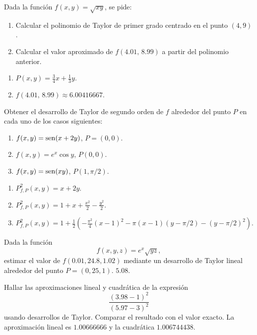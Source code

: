 
{Dada la función $f(x,y)=\sqrt{xy}$, se pide:
\begin{enumerate}
\item Calcular el polinomio de Taylor de primer grado centrado en el punto $(4,9)$.
\item Calcular el valor aproximado de $f(4.01,\,8.99)$ a partir del polinomio anterior. 
\end{enumerate}
}
{\begin{enumerate}
\item $P(x,y)= \frac{3}{4}x+\frac{1}{3}y$.
\item $f(4.01,\,8.99)\approx 6.00416667$.
\end{enumerate}
}
{
}


{Obtener el desarrollo de Taylor de segundo orden de $f$ alrededor del punto $P$ en cada uno de los casos siguientes:
\begin{enumerate}
\item $f(x,y)=\operatorname{sen}(x+2y)$, $P=(0,0)$.
\item $f(x,y)=e^x\cos y$, $P(0,0)$.
\item $f(x,y)=\operatorname{sen}(xy)$, $P(1,\pi/2)$.
\end{enumerate}
}
{\begin{enumerate}
\item $P^2_{f,P}(x,y)= x+2y$.
\item $P^2_{f,P}(x,y)= 1+x+\frac{x^2}{2}-\frac{y^2}{2}$.
\item $P^2_{f,P}(x,y)= 1+\frac{1}{2}\left(-\frac{\pi^2}{4}(x-1)^2-\pi(x-1)(y-\pi/2)-(y-\pi/2)^2\right)$.
\end{enumerate}
}
{
}


{Dada la función 
\[
f(x,y,z)=e^x\sqrt{yz},
\]
estimar el valor de $f(0.01,24.8,1.02)$ mediante un desarrollo de Taylor lineal alrededor del punto $P=(0,25,1)$.
}
{$5.08$.
}
{
}


{Hallar las aproximaciones lineal y cuadrática de la expresión
\[
\frac{(3.98-1)^2}{(5.97-3)^2}
\]
usando desarrollos de Taylor. Comparar el resultado con el valor exacto.
}
{La aproximación lineal es $1.00666666$ y la cuadrática $1.006744438$.
}
{
}
